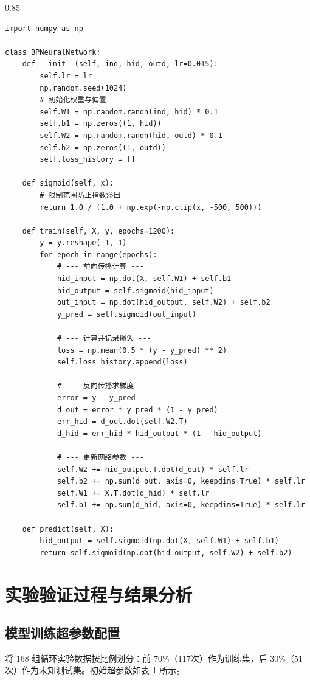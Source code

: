 \documentclass[twocolumn,10pt,a4paper,twoside]{ctexart}
\begin{document}
\begin{spacing}{0.85}
    \begin{lstlisting}
import numpy as np

class BPNeuralNetwork:
    def __init__(self, ind, hid, outd, lr=0.015):
        self.lr = lr
        np.random.seed(1024)
        # 初始化权重与偏置
        self.W1 = np.random.randn(ind, hid) * 0.1
        self.b1 = np.zeros((1, hid))
        self.W2 = np.random.randn(hid, outd) * 0.1
        self.b2 = np.zeros((1, outd))
        self.loss_history = []

    def sigmoid(self, x):
        # 限制范围防止指数溢出
        return 1.0 / (1.0 + np.exp(-np.clip(x, -500, 500)))

    def train(self, X, y, epochs=1200):
        y = y.reshape(-1, 1)
        for epoch in range(epochs):
            # --- 前向传播计算 ---
            hid_input = np.dot(X, self.W1) + self.b1
            hid_output = self.sigmoid(hid_input)
            out_input = np.dot(hid_output, self.W2) + self.b2
            y_pred = self.sigmoid(out_input)

            # --- 计算并记录损失 ---
            loss = np.mean(0.5 * (y - y_pred) ** 2)
            self.loss_history.append(loss)

            # --- 反向传播求梯度 ---
            error = y - y_pred
            d_out = error * y_pred * (1 - y_pred)
            err_hid = d_out.dot(self.W2.T)
            d_hid = err_hid * hid_output * (1 - hid_output)

            # --- 更新网络参数 ---
            self.W2 += hid_output.T.dot(d_out) * self.lr
            self.b2 += np.sum(d_out, axis=0, keepdims=True) * self.lr
            self.W1 += X.T.dot(d_hid) * self.lr
            self.b1 += np.sum(d_hid, axis=0, keepdims=True) * self.lr

    def predict(self, X):
        hid_output = self.sigmoid(np.dot(X, self.W1) + self.b1)
        return self.sigmoid(np.dot(hid_output, self.W2) + self.b2)
\end{lstlisting}
\end{spacing}

\section{实验验证过程与结果分析}

\subsection{模型训练超参数配置}
将 168 组循环实验数据按比例划分：前 70\%（117次）作为训练集，后 30\%（51次）作为未知测试集。初始超参数如表 1 所示。
\end{document}
